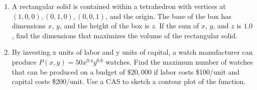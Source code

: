 \documentclass{exercises}
\begin{document}
\begin{enumerate}[resume]
\item A rectangular solid is contained within a tetrahedron with vertices at $(1,0,0),(0,1,0),(0,0,1)$, and the origin. The base of the box has dimensions $x$, $y$, and the height of the box is $z$. If the sum of $x$, $y$, and $z$ is $1.0$, find the dimensions that maximizes the volume of the rectangular solid.
\item \techrequired By investing x units of labor and y units of capital, a watch manufacturer can produce $P(x,y)=50x^{0.4}y^{0.6}$ watches. Find the maximum number of watches that can be produced on a budget of $\$20{,}000$ if labor costs \$100/unit and capital costs \$200/unit. Use a CAS to sketch a contour plot of the function.
\end{enumerate}
\end{document}
